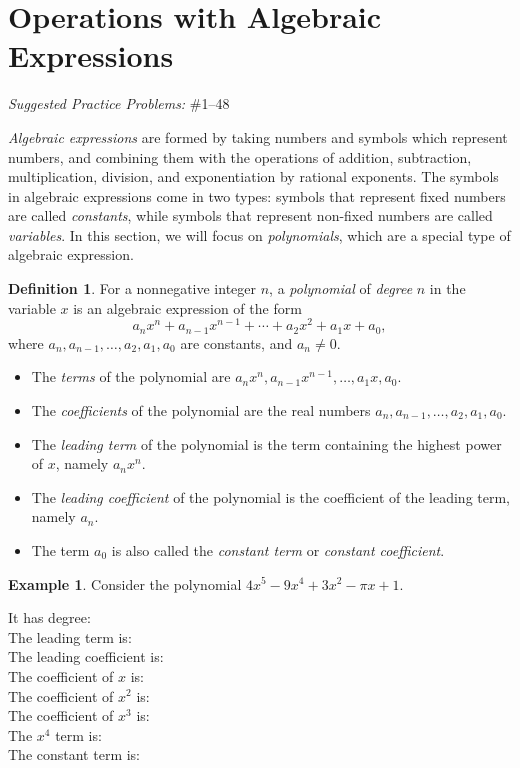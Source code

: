 \documentclass[letterpaper,12pt,oneside]{book}
\theoremstyle{definition}
\newtheorem{definition}[theorem]{Definition}
\newtheorem{example}[theorem]{Example}
\newcommand{\practicesection}[2]{%
    \section{#1}
    \textit{Suggested Practice Problems:} #2
    \smallskip%
}
\begin{document}
\newpage

\practicesection{Operations with Algebraic Expressions}{\#1--48}

\label{Sec:AlgExp}

\noindent
\emph{Algebraic expressions} are formed by taking numbers and symbols which represent numbers, and combining them with the operations of addition, subtraction, multiplication, division, and exponentiation by rational exponents.  The symbols in algebraic expressions come in two types: symbols that represent fixed numbers are called \emph{constants}, while symbols that represent non-fixed numbers are called \emph{variables}.  In this section, we will focus on \emph{polynomials}, which are a special type of algebraic expression.


\begin{definition}
For a nonnegative integer $n$, a \emph{polynomial} of \emph{degree} $n$ in the variable $x$ is an algebraic expression of the form 
\[
a_nx^n+a_{n-1}x^{n-1}+\cdots+a_2x^2+a_1x+a_0,
\]
where $a_n,a_{n-1},\ldots,a_2,a_1,a_0$ are constants, and $a_n\neq 0$.
\begin{itemize}
\item The \emph{terms} of the polynomial are $a_nx^n, a_{n-1}x^{n-1}, \ldots, a_1x, a_0$.
\item The \emph{coefficients} of the polynomial are the real numbers $a_n,a_{n-1},\ldots,a_2,a_1,a_0$.
\item The \emph{leading term} of the polynomial is the term containing the highest power of $x$, namely $a_nx^n$.  
\item The \emph{leading coefficient} of the polynomial is the coefficient of the leading term, namely $a_n$.
\item The term $a_0$ is also called the \emph{constant term} or \emph{constant coefficient}.
\end{itemize}
\end{definition}

\begin{example}
Consider the polynomial $4x^5-9x^4+3x^2-\pi x+1.$
\begin{multicols}{2}
\noindent
It has degree:\\[3pt]
The leading term is:\\[3pt]
The leading coefficient is:\\[3pt]
The coefficient of $x$ is:\\[3pt]
The coefficient of $x^2$ is:\\[3pt]
The coefficient of $x^3$ is:\\[3pt]
The $x^4$ term is:\\[3pt]
The constant term is:
\end{multicols}
\end{example}
\end{document}
